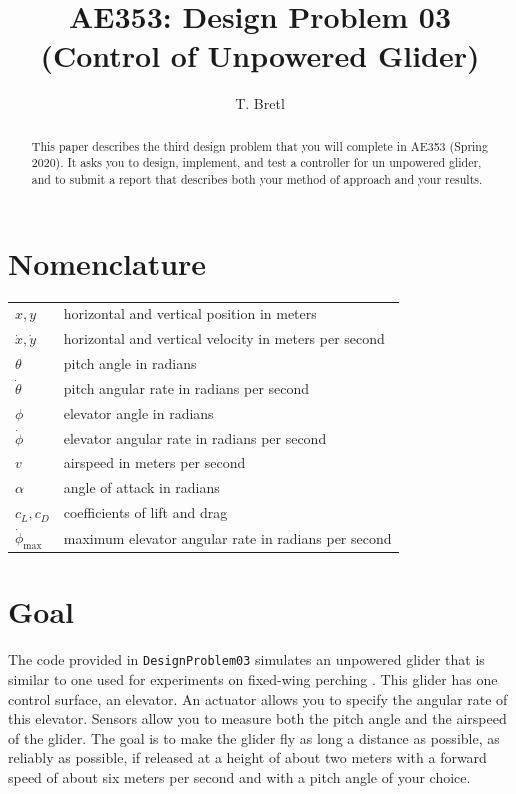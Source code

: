 \documentclass[conf]{new-aiaa}
\title{AE353: Design Problem 03\\ (Control of Unpowered Glider)}
\author{T. Bretl}
\begin{document}
\maketitle


\begin{abstract}
This paper describes the third design problem that you will complete in AE353 (Spring 2020). It asks you to design, implement, and test a controller for un unpowered glider, and to submit a report that describes both your method of approach and your results.
\end{abstract}

\section{Nomenclature}

{\renewcommand\arraystretch{1.0}
\noindent\begin{longtable*}{@{}l @{\quad=\quad} l@{}}
$x, y$ & horizontal and vertical position in meters \\
$\dot{x}, \dot{y}$ & horizontal and vertical velocity in meters per second\\
$\theta$ & pitch angle in radians \\
$\dot{\theta}$ & pitch angular rate in radians per second \\
$\phi$ & elevator angle in radians \\
$\dot{\phi}$ & elevator angular rate in radians per second \\
$v$ & airspeed in meters per second \\
$\alpha$ & angle of attack in radians \\
$c_{L}, c_{D}$ & coefficients of lift and drag \\
$\dot{\phi}_{\text{max}}$ & maximum elevator angular rate in radians per second
\end{longtable*}}



\section{Goal}

The code provided in \lstinline!DesignProblem03! simulates an unpowered glider that is similar to one used for experiments on fixed-wing perching \cite{Roberts2009,Moore2014}. This glider has one control surface, an elevator. An actuator allows you to specify the angular rate of this elevator. Sensors allow you to measure both the pitch angle and the airspeed of the glider. The goal is to make the glider fly as long a distance as possible, as reliably as possible, if released at a height of about two meters with a forward speed of about six meters per second and with a pitch angle of your choice.
\end{document}
